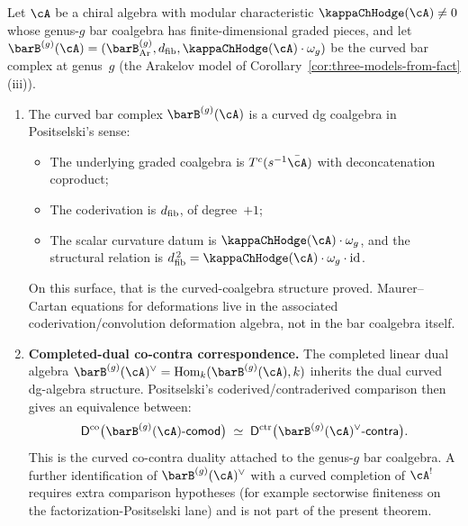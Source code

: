 \begin{theorem}
\label{thm:curved-koszul-genus-g}

Let $\cA$ be a chiral algebra with modular characteristic
$\kappaChHodge(\cA) \neq 0$ whose genus-$g$ bar coalgebra has
finite-dimensional graded pieces, and let
$\barB^{(g)}(\cA) = (\barB^{(g)}_{\mathrm{Ar}}, \dfib,
\kappaChHodge(\cA) \cdot \omega_g)$ be the curved bar complex at genus~$g$
\textup{(}the Arakelov model of
Corollary~\textup{\ref{cor:three-models-from-fact}(iii))}.

\begin{enumerate}[label=\textup{(\roman*)}]
\item The curved bar complex $\barB^{(g)}(\cA)$ is a curved dg
 coalgebra in Positselski's sense:
 \begin{itemize}
 \item The underlying graded coalgebra is
 $T^c(s^{-1}\bar\cA)$ with deconcatenation coproduct;
 \item The coderivation is $d_{\mathrm{fib}}$, of degree~$+1$;
 \item The scalar curvature datum is
 $\kappaChHodge(\cA) \cdot \omega_g$, and the structural relation is
 $\dfib^{\,2} = \kappaChHodge(\cA) \cdot \omega_g \cdot \id$.
 \end{itemize}
 On this surface, that is the curved-coalgebra structure
 proved. Maurer--Cartan equations for deformations live in the
 associated coderivation/convolution deformation algebra, not in
 the bar coalgebra itself.

\item \textbf{Completed-dual co-contra correspondence.}
 The completed linear dual algebra
 $\barB^{(g)}(\cA)^\vee = \operatorname{Hom}_k(\barB^{(g)}(\cA), k)$
 inherits the dual curved dg-algebra structure. Positselski's
 coderived/contraderived comparison then gives an equivalence
 between:
 \begin{equation}\label{eq:curved-koszul-equivalence}
 \Dco\bigl(\barB^{(g)}(\cA)\text{-}\mathsf{comod}\bigr)
 \;\simeq\;
 \Dctr\bigl(\barB^{(g)}(\cA)^\vee\text{-}\mathsf{contra}\bigr).
 \end{equation}
 This is the curved co-contra duality attached to the genus-$g$
 bar coalgebra. A further identification of
 $\barB^{(g)}(\cA)^\vee$ with a curved completion of $\cA^!$
 requires extra comparison hypotheses
 \textup{(}for example sectorwise finiteness on the
 factorization-Positselski lane\textup{)} and is not part of the
 present theorem.


\end{enumerate}
\end{theorem}
